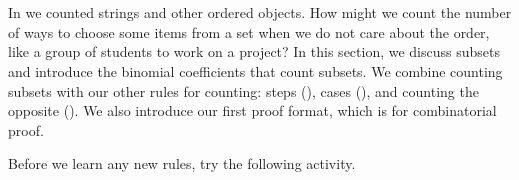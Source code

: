 \section{\seccountingsubsets}
\label{sec_counting_subsets}

In  we counted strings and other ordered objects.  How might we count the number of ways to choose some items from a set when we do not care about the order, like a group of students to work on a project? In this section, we discuss subsets and introduce the binomial coefficients that count subsets.  We combine counting subsets with our other rules for counting: steps (), cases (), and counting the opposite (). We also introduce our first proof format, which is for combinatorial proof.

Before we learn any new rules, try the following activity.

